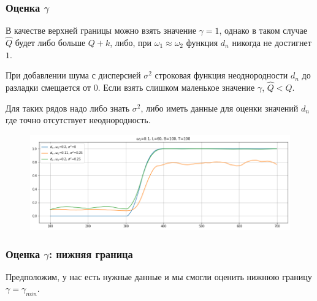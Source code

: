 \documentclass[11pt]{beamer}
\begin{document}
	\begin{frame}
		\frametitle{Оценка $ \gamma $}
		В качестве верхней границы можно взять значение $ \gamma = 1 $, однако в таком случае $ \hat{Q} $ будет либо больше $ Q+k $, либо, при $ \omega_1 \approx \omega_2 $ функция $ d_n $ никогда не достигнет $ 1 $.
		
		При добавлении шума с дисперсией $ \sigma^2 $ строковая функция неоднородности $ d_n $ до разладки смещается от $ 0 $. Если взять слишком маленькое значение $ \gamma $, $ \hat{Q} < Q $. 
		
		Для таких рядов надо либо знать $ \sigma^2 $, либо иметь данные для оценки значений $ d_n $ где точно отсутствует неоднородность. 
		
		\begin{figure}[b]
			\centering
			\includegraphics[width=\linewidth]{imgs/estimate_gamma_noise}
		\end{figure}
	\end{frame}

	\begin{frame}
		\frametitle{Оценка $ \gamma $: нижняя граница}
		Предположим, у нас есть нужные данные и мы смогли оценить нижнюю границу $ \gamma = \gamma_{min} $.
	\end{frame}
\end{document}
